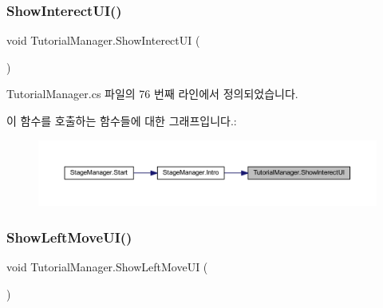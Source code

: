 \subsubsection{\texorpdfstring{ShowInterectUI()}{ShowInterectUI()}}
{\footnotesize\ttfamily void Tutorial\+Manager.\+Show\+Interect\+UI (\begin{DoxyParamCaption}{ }\end{DoxyParamCaption})}



Tutorial\+Manager.\+cs 파일의 76 번째 라인에서 정의되었습니다.


\begin{DoxyCode}{0}

\end{DoxyCode}
이 함수를 호출하는 함수들에 대한 그래프입니다.\+:\nopagebreak
\begin{figure}[H]
\begin{center}
\leavevmode
\includegraphics[width=350pt]{d6/d14/class_tutorial_manager_a11eddc71a4c6be52e2e52bbe0357afe4_icgraph}
\end{center}
\end{figure}
\mbox{\label{class_tutorial_manager_a852b4a32183004ef9513d7e43b99c247}} 
\subsubsection{\texorpdfstring{ShowLeftMoveUI()}{ShowLeftMoveUI()}}
{\footnotesize\ttfamily void Tutorial\+Manager.\+Show\+Left\+Move\+UI (\begin{DoxyParamCaption}{ }\end{DoxyParamCaption})}



